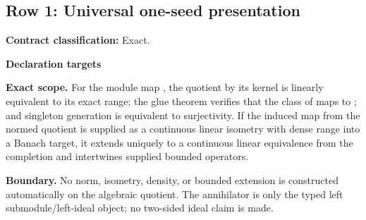 \subsection{Row 1: Universal one-seed presentation}
\label{row:1}
\textbf{Contract classification:} Exact.
\par\smallskip\textbf{Declaration targets}\par
{\small\noindent{}\par}
{\small\noindent{}\par}
{\small\noindent{}\par}
{\small\noindent{}\par}
{\small\noindent{}\par}
{\small\noindent{}\par}
\medskip\noindent\textbf{Exact scope.} For the module map , the quotient by its kernel is linearly equivalent to its exact range; the glue theorem verifies that the class of  maps to ; and singleton generation is equivalent to surjectivity. If the induced map from the normed quotient is supplied as a continuous linear isometry with dense range into a Banach target, it extends uniquely to a continuous linear equivalence from the completion and intertwines supplied bounded operators.
\par\smallskip\noindent\textbf{Boundary.} No norm, isometry, density, or bounded extension is constructed automatically on the algebraic quotient. The annihilator is only the typed left submodule/left-ideal object; no two-sided ideal claim is made.
\medskip
